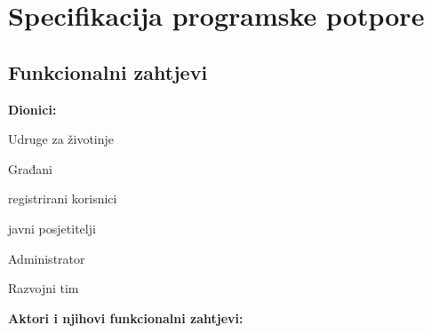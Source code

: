 \chapter{Specifikacija programske potpore}
		
	\section{Funkcionalni zahtjevi}
		
			
			\noindent \textbf{Dionici:}
			
			\begin{packed_enum}
				
				\item Udruge za životinje
				\item Građani
				\begin{packed_enum}
				    \item registrirani korisnici
				    \item javni posjetitelji
				\end{packed_enum}
				\item Administrator
				\item Razvojni tim
				
			\end{packed_enum}
			
			\noindent \textbf{Aktori i njihovi funkcionalni zahtjevi:}
			
